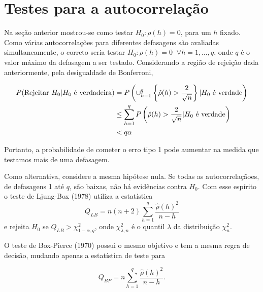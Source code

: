 \documentclass[
  letterpaper,
  DIV=11,
  numbers=noendperiod]{scrreprt}
\theoremstyle{definition}
\theoremstyle{plain}
\theoremstyle{definition}
\theoremstyle{remark}
\begin{document}
\hypertarget{testes-para-a-autocorrelauxe7uxe3o}{%
\section{Testes para a
autocorrelação}\label{testes-para-a-autocorrelauxe7uxe3o}}

Na seção anterior mostrou-se como testar \(H_0:\rho(h)=0\), para um
\(h\) fixado. Como várias autocorrelações para diferentes defasagens são
avaliadas simultaneamente, o correto seria testar
\(H_0: \rho(h)=0\;\;\forall h=1,\ldots,q\), onde \(q\) é o valor máximo
da defasagem a ser testado. Considerando a região de rejeição dada
anteriormente, pela desigualdade de Bonferroni,

\[\begin{align}P(\hbox{Rejeitar }H_0|H_0\hbox{ é verdadeira})&=P\left(\cup_{h=1}^q\left\{ \hat{\rho}(h)>\frac{2}{\sqrt{n}}\right\}| H_0\hbox{ é verdade}\right)\\
&\leq \sum_{h=1}^qP\left( \hat{\rho}(h)>\frac{2}{\sqrt{n}}| H_0\hbox{ é verdade}\right)\\ &<q\alpha\end{align}\]

Portanto, a probabilidade de cometer o erro tipo 1 pode aumentar na
medida que testamos mais de uma defasagem.

Como alternativa, considere a mesma hipótese nula. Se todas as
autocorrelaçãoes, de defasagens 1 até \(q\), são baixas, não há
evidências contra \(H_0\). Com esse espírito o teste de Ljung-Box (1978)
utiliza a estatística
\[Q_{LB}=n(n+2)\sum_{h=1}^q \frac{\hat{\rho}(h)^2}{n-h}\] e rejeita
\(H_0\) se \(Q_{LB}>\chi^2_{1-\alpha,q}\), onde \(\chi^2_{\lambda,n}\) é
o quantil \(\lambda\) da distribuição \(\chi^2_n\).

O teste de Box-Pierce (1970) possui o mesmo objetivo e tem a mesma regra
de decisão, mudando apenas a estatística de teste para

\[Q_{BP}=n\sum_{h=1}^q \frac{\hat{\rho}(h)^2}{n-h}.\]
\end{document}
